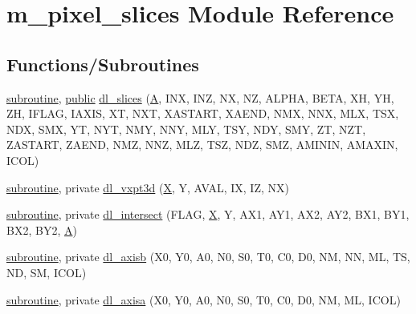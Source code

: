 \hypertarget{namespacem__pixel__slices}{}\section{m\+\_\+pixel\+\_\+slices Module Reference}
\label{namespacem__pixel__slices}
\subsection*{Functions/\+Subroutines}
\begin{DoxyCompactItemize}
\item 
\hyperlink{M__stopwatch_83_8txt_acfbcff50169d691ff02d4a123ed70482}{subroutine}, \hyperlink{M__stopwatch_83_8txt_a2f74811300c361e53b430611a7d1769f}{public} \hyperlink{namespacem__pixel__slices_ac9e60bae24d6a1525af0da041bc1cf55}{dl\+\_\+slices} (\hyperlink{ufpp__overview_81_8txt_a8341271e5f4e3003f6eb1c9547fc9d1a}{A}, I\+NX, I\+NZ, NX, NZ, A\+L\+P\+HA, B\+E\+TA, XH, YH, ZH, I\+F\+L\+AG, I\+A\+X\+IS, XT, N\+XT, X\+A\+S\+T\+A\+RT, X\+A\+E\+ND, N\+MX, N\+NX, M\+LX, T\+SX, N\+DX, S\+MX, YT, N\+YT, N\+MY, N\+NY, M\+LY, T\+SY, N\+DY, S\+MY, ZT, N\+ZT, Z\+A\+S\+T\+A\+RT, Z\+A\+E\+ND, N\+MZ, N\+NZ, M\+LZ, T\+SZ, N\+DZ, S\+MZ, A\+M\+I\+N\+IN, A\+M\+A\+X\+IN, I\+C\+OL)
\item 
\hyperlink{M__stopwatch_83_8txt_acfbcff50169d691ff02d4a123ed70482}{subroutine}, private \hyperlink{namespacem__pixel__slices_a61f419d67b700758eceed72e406a37f0}{dl\+\_\+vxpt3d} (\hyperlink{intro__blas1_83_8txt_ac8596739bc875e90fe6e2ecf98e87906}{X}, Y, A\+V\+AL, IX, IZ, NX)
\item 
\hyperlink{M__stopwatch_83_8txt_acfbcff50169d691ff02d4a123ed70482}{subroutine}, private \hyperlink{namespacem__pixel__slices_a1508683ec3b2444091bb34d40b5d8b93}{dl\+\_\+intersect} (F\+L\+AG, \hyperlink{intro__blas1_83_8txt_ac8596739bc875e90fe6e2ecf98e87906}{X}, Y, A\+X1, A\+Y1, A\+X2, A\+Y2, B\+X1, B\+Y1, B\+X2, B\+Y2, \hyperlink{ufpp__overview_81_8txt_a8341271e5f4e3003f6eb1c9547fc9d1a}{A})
\item 
\hyperlink{M__stopwatch_83_8txt_acfbcff50169d691ff02d4a123ed70482}{subroutine}, private \hyperlink{namespacem__pixel__slices_ab70907b4409a4346c450488b5bcb34a8}{dl\+\_\+axisb} (X0, Y0, A0, N0, S0, T0, C0, D0, NM, NN, ML, TS, ND, SM, I\+C\+OL)
\item 
\hyperlink{M__stopwatch_83_8txt_acfbcff50169d691ff02d4a123ed70482}{subroutine}, private \hyperlink{namespacem__pixel__slices_afcc122fe448b5f806c0a372a203cd9ea}{dl\+\_\+axisa} (X0, Y0, A0, N0, S0, T0, C0, D0, NM, ML, I\+C\+OL)

\end{DoxyCompactItemize}
